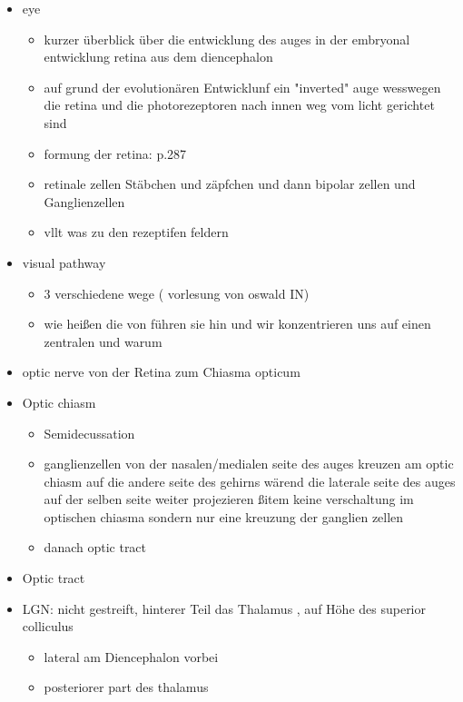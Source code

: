 \documentclass[12pt,a4paper,pdftex]{article}
\begin{document}
\begin{itemize}
    \item eye
    \begin{itemize}
        \item kurzer überblick über die entwicklung des auges in der embryonal entwicklung retina aus dem diencephalon
        \item auf grund der evolutionären Entwicklunf ein "inverted" auge wesswegen die retina und die photorezeptoren nach innen weg vom licht gerichtet sind
        \item formung der retina: \cite{smith2008biology} p.287
        \item retinale zellen Stäbchen und zäpfchen und dann bipolar zellen und Ganglienzellen 
        \item vllt was zu den rezeptifen feldern
    \end{itemize}
    \item visual pathway
    \begin{itemize}
        \item 3 verschiedene wege ( vorlesung von oswald IN)
        \item wie heißen die von führen sie hin und wir konzentrieren uns auf einen zentralen und warum
    \end{itemize}
    \item optic nerve von der Retina zum Chiasma opticum
    \item Optic chiasm    
    \begin{itemize}
        \item Semidecussation  
        \item ganglienzellen von der nasalen/medialen seite des auges kreuzen am optic chiasm auf die andere seite des gehirns wärend die laterale seite des auges auf der selben seite weiter projezieren
        ßitem keine verschaltung im optischen chiasma sondern nur eine kreuzung der ganglien zellen
        \item danach optic tract
    \end{itemize}
    \item Optic tract 
    \item LGN: nicht gestreift, hinterer Teil das Thalamus , auf Höhe des superior colliculus 
    \begin{itemize}
        \item lateral am Diencephalon  vorbei
        \item posteriorer part des thalamus

\end{itemize}
\end{itemize}
\end{document}
